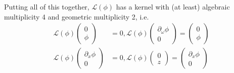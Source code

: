 \documentclass[12pt]{article}
\def\calL{{\mathcal L}}
\begin{document}
Putting all of this together, $\calL(\phi)$ has a kernel with (at least) algebraic multiplicity 4 and geometric multiplicity 2, i.e.
\begin{align*}
\calL(\phi)\begin{pmatrix}0 \\ \phi \end{pmatrix} &= 0, 
\calL(\phi)\begin{pmatrix} \partial_\omega \phi \\ 0 \end{pmatrix} = \begin{pmatrix}0 \\ \phi \end{pmatrix} \\
\calL(\phi)\begin{pmatrix}\partial_x\phi \\ 0 \end{pmatrix} &= 0, 
\calL(\phi)\begin{pmatrix} 0 \\ z \end{pmatrix} = \begin{pmatrix}\partial_x\phi \\ 0 \end{pmatrix} 
\end{align*}
\end{document}
